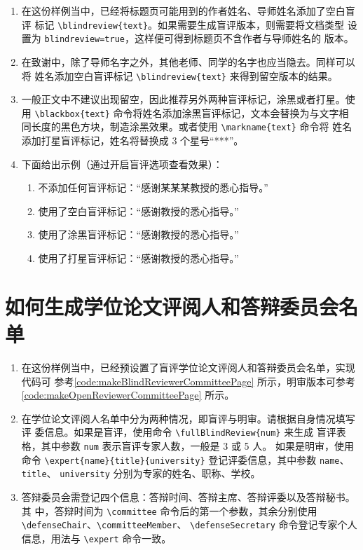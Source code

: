 \documentclass[lang=chs, degree=master, blindreview=false, adobe=false]{yanputhesis}
\begin{document}
\begin{enumerate}
    \setlength{\itemsep}{0pt}
    \item 在这份样例当中，已经将标题页可能用到的作者姓名、导师姓名添加了空白盲评
          标记 \lstinline`\blindreview{text}`。如果需要生成盲评版本，则需要将文档类型
          设置为 \lstinline`blindreview=true`，这样便可得到标题页不含作者与导师姓名的
          版本。
    \item 在致谢中，除了导师名字之外，其他老师、同学的名字也应当隐去。同样可以将
          姓名添加空白盲评标记 \lstinline`\blindreview{text}` 来得到留空版本的结果。
    \item 一般正文中不建议出现留空，因此推荐另外两种盲评标记，涂黑或者打星。使用
          \lstinline`\blackbox{text}` 命令将姓名添加涂黑盲评标记，文本会替换为与文字相
          同长度的黑色方块，制造涂黑效果。或者使用 \lstinline`\markname{text}` 命令将
          姓名添加打星盲评标记，姓名将替换成 3 个星号“***”。
    \item 下面给出示例（通过开启盲评选项查看效果）：
          \begin{enumerate}
              \setlength{\itemsep}{0pt}
              \item 不添加任何盲评标记：“感谢某某某教授的悉心指导。”
              \item 使用了空白盲评标记：“感谢教授的悉心指导。”
              \item 使用了涂黑盲评标记：“感谢教授的悉心指导。”
              \item 使用了打星盲评标记：“感谢教授的悉心指导。”
          \end{enumerate}
\end{enumerate}

\section{如何生成学位论文评阅人和答辩委员会名单}

\begin{enumerate}
    \setlength{\itemsep}{0pt}
    \item 在这份样例当中，已经预设置了盲评学位论文评阅人和答辩委员会名单，实现代码可
          参考\autoref{code:makeBlindReviewerCommitteePage} 所示，明审版本可参考
          \autoref{code:makeOpenReviewerCommitteePage} 所示。
    \item 在学位论文评阅人名单中分为两种情况，即盲评与明审。请根据自身情况填写评
          委信息。如果是盲评，使用命令 \lstinline`\fullBlindReview{num}` 来生成
          盲评表格，其中参数 \lstinline`num` 表示盲评专家人数，一般是 3 或 5 人。
          如果是明审，使用命令 \lstinline`\expert{name}{title}{university}`
          登记评委信息，其中参数 \lstinline`name`、\lstinline`title`、
          \lstinline`university` 分别为专家的姓名、职称、学校。
    \item 答辩委员会需登记四个信息：答辩时间、答辩主席、答辩评委以及答辩秘书。其
          中，答辩时间为 \lstinline`\committee` 命令后的第一个参数，其余分别使用
          \lstinline`\defenseChair`、\lstinline`\committeeMember`、
          \lstinline`\defenseSecretary` 命令登记专家个人信息，用法与
          \lstinline`\expert` 命令一致。
\end{enumerate}
\end{document}
